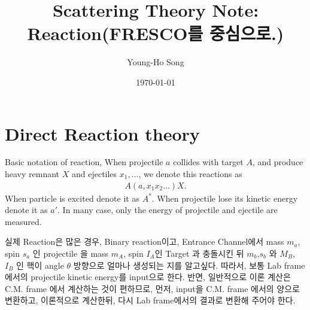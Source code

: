 \documentclass[11pt]{book}
\title{Scattering Theory Note: Reaction(FRESCO를 중심으로.)}
\author{Young-Ho Song}
\date{\today}
\newcommand{\bea}{\begin{eqnarray}}
\newcommand{\eea}{\end{eqnarray}}
\begin{document}
\maketitle
\tableofcontents
\newpage

\chapter{Direct Reaction theory} 

Basic notation of reaction,
When projectile $a$ collides with target $A$, and produce heavy remnant $X$
and ejectiles $x_1,\dots$, we denote
this reactions as
\bea 
A(a,x_1 x_2\dots)X.
\eea  
When particle is excited denote it as $A^*$. When projectile lose its 
kinetic energy denote it as $a'$. In many case, only the energy of projectile and ejectile are measured. 

실제 Reaction은 많은 경우, Binary reaction이고, Entrance Channel에서 
mass $m_a$, spin $s_a$ 인 projectile 을 mass $m_A$, spin $I_A$인 Target
과 충돌시킨 뒤 $m_b$,$s_b$ 와 $M_B$, $I_B$ 인 핵이 angle $\theta$ 방향으로 
얼마나 생성되는 지를 알고싶다. 따라서, 보통 Lab frame에서의 projectile kinetic energy를 
input으로 한다.  반면, 일반적으로 이론 계산은 C.M. frame 에서 계산하는 것이
편하므로, 먼저, input을 C.M. frame 에서의 양으로 변환하고, 이론적으로 계산한뒤, 
다시 Lab frame에서의 결과로 변환해 주어야 한다. 
\end{document}
